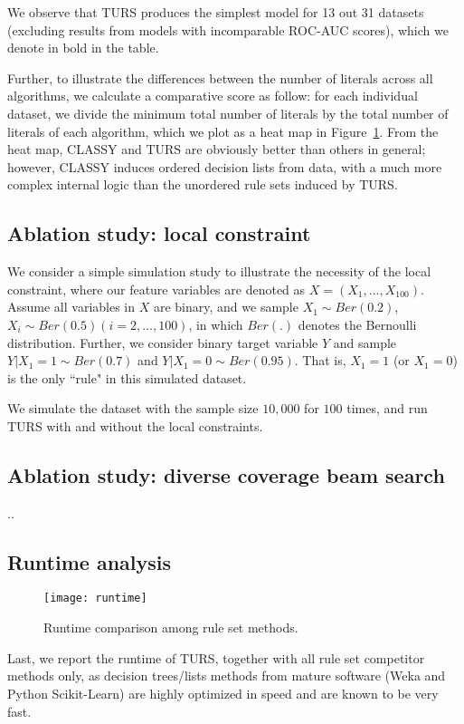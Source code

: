 We observe that TURS produces the simplest model for 13 out 31 datasets (excluding results from models with incomparable ROC-AUC scores), which we denote in bold in the table. 

Further, to illustrate the differences between the number of literals across all algorithms, we calculate a comparative score as follow: for each individual dataset, we divide the minimum total number of literals by the total number of literals of each algorithm, which we plot as a heat map in Figure~\ref{fig:heatmap_modelcomplexity}. From the heat map, CLASSY and TURS are obviously better than others in general; however, CLASSY induces ordered decision lists from data, with a much more complex internal logic than the unordered rule sets induced by TURS. 


\subsection{Ablation study: local constraint}
We consider a simple simulation study to illustrate the necessity of the local constraint, where our feature variables are denoted as $X = (X_1, ..., X_{100})$. Assume all variables in $X$ are binary, and we sample $X_1 \sim Ber(0.2)$, $X_i \sim Ber(0.5) (i = 2, ..., 100)$, in which $Ber(.)$ denotes the Bernoulli distribution. Further, we consider binary target variable $Y$ and sample $Y|X_1 = 1 \sim Ber(0.7)$ and $Y|X_1 = 0 \sim Ber(0.95)$. That is, $X_1 = 1$ (or $X_1 = 0$) is the only ``rule" in this simulated dataset. 

We simulate the dataset with the sample size $10,000$ for $100$ times, and run TURS with and without the local constraints.  

\subsection{Ablation study: diverse coverage beam search}
..
\subsection{Runtime analysis}
\begin{figure}[ht] \label{fig:runtime}
	\texttt{[image: runtime]}
	\caption{Runtime comparison among rule set methods.}	 
	\label{fig:heatmap_modelcomplexity}
\end{figure}
Last, we report the runtime of TURS, together with all rule set competitor methods only, as decision trees/lists methods from mature software (Weka and Python Scikit-Learn) are highly optimized in speed and are known to be very fast. 

